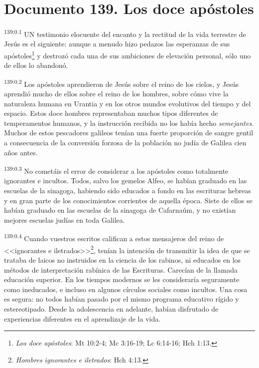 \chapter{Documento 139. Los doce apóstoles}
\par 
\textsuperscript{139:0.1} UN testimonio elocuente del encanto y la rectitud de la vida terrestre de Jesús es el siguiente: aunque a menudo hizo pedazos las esperanzas de sus apóstoles\footnote{\textit{Los doce apóstoles}: Mt 10:2-4; Mc 3:16-19; Lc 6:14-16; Hch 1:13.} y destrozó cada una de sus ambiciones de elevación personal, sólo uno de ellos lo abandonó.

\par 
\textsuperscript{139:0.2} Los apóstoles aprendieron de Jesús sobre el reino de los cielos, y Jesús aprendió mucho de ellos sobre el reino de los hombres, sobre cómo vive la naturaleza humana en Urantia y en los otros mundos evolutivos del tiempo y del espacio. Estos doce hombres representaban muchos tipos diferentes de temperamentos humanos, y la instrucción recibida no los había hecho \textit{semejantes}. Muchos de estos pescadores galileos tenían una fuerte proporción de sangre gentil a consecuencia de la conversión forzosa de la población no judía de Galilea cien años antes.

\par 
\textsuperscript{139:0.3} No cometáis el error de considerar a los apóstoles como totalmente ignorantes e incultos. Todos, salvo los gemelos Alfeo, se habían graduado en las escuelas de la sinagoga, habiendo sido educados a fondo en las escrituras hebreas y en gran parte de los conocimientos corrientes de aquella época. Siete de ellos se habían graduado en las escuelas de la sinagoga de Cafarnaúm, y no existían mejores escuelas judías en toda Galilea.

\par 
\textsuperscript{139:0.4} Cuando vuestros escritos califican a estos mensajeros del reino de <<ignorantes e iletrados>>\footnote{\textit{Hombres ignorantes e iletrados}: Hch 4:13.}, tenían la intención de transmitir la idea de que se trataba de laicos no instruidos en la ciencia de los rabinos, ni educados en los métodos de interpretación rabínica de las Escrituras. Carecían de la llamada educación superior. En los tiempos modernos se les consideraría seguramente como ineducados, e incluso en algunos círculos sociales como incultos. Una cosa es segura: no todos habían pasado por el mismo programa educativo rígido y estereotipado. Desde la adolescencia en adelante, habían disfrutado de experiencias diferentes en el aprendizaje de la vida.

